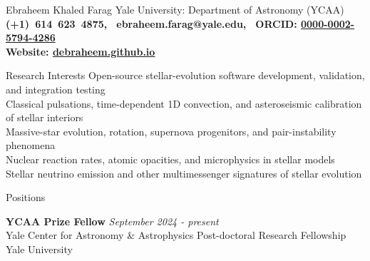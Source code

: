 \documentclass{resume} %
\begin{document}
\begin{rSection}{Ebraheem Khaled Farag}
 \centering 
Yale University: Department of Astronomy (YCAA)
\\ \textbf{(+1)~614~623~4875, \,  ebraheem.farag@yale.edu, \, ORCID: \href{https://orcid.org/0000-0002-5794-4286}{0000-0002-5794-4286}}
\\ \textbf{Website: \href{https://debraheem.github.io/}{debraheem.github.io}}
\end{rSection}

\begin{rSection}{Research Interests}
Open-source stellar-evolution software development, validation, and integration testing
\\Classical pulsations, time-dependent 1D convection, and asteroseismic calibration of stellar interiors
\\Massive-star evolution, rotation, supernova progenitors, and pair-instability phenomena
\\Nuclear reaction rates, atomic opacities, and microphysics in stellar models
\\Stellar neutrino emission and other multimessenger signatures of stellar evolution
\end{rSection}





\begin{rSection}{Positions}

{\bf YCAA Prize Fellow} \hfill {\em September 2024 - present } 
\\ Yale Center for Astronomy \& Astrophysics Post-doctoral Research Fellowship  \hfill { Yale University}

\end{rSection}

\end{document}
